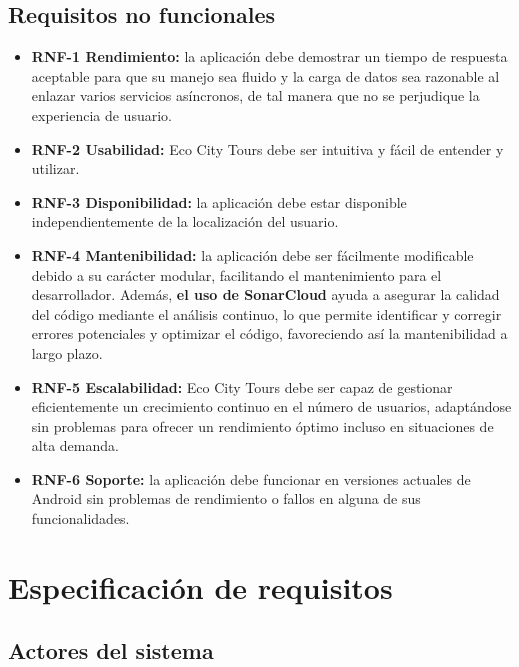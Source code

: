 \subsection{Requisitos no funcionales}
\begin{itemize}
	\item \textbf{RNF-1 Rendimiento:} la aplicación debe demostrar un tiempo de respuesta aceptable para que su manejo sea fluido y la carga de datos sea razonable al enlazar varios servicios asíncronos, de tal manera que no se perjudique la experiencia de usuario. 
	\item \textbf{RNF-2 Usabilidad:} Eco City Tours debe ser intuitiva y fácil de entender y utilizar.
	\item \textbf{RNF-3 Disponibilidad:} la aplicación debe estar disponible independientemente de la localización del usuario.
	\item \textbf{RNF-4 Mantenibilidad:} la aplicación debe ser fácilmente modificable debido a su carácter modular, facilitando el mantenimiento para el desarrollador. Además, \textbf{el uso de SonarCloud} ayuda a asegurar la calidad del código mediante el análisis continuo, lo que permite identificar y corregir errores potenciales y optimizar el código, favoreciendo así la mantenibilidad a largo plazo.
	
	\item \textbf{RNF-5 Escalabilidad:} Eco City Tours debe ser capaz de gestionar eficientemente un crecimiento continuo en el número de usuarios, adaptándose sin problemas para ofrecer un rendimiento óptimo incluso en situaciones de alta demanda.
	\item \textbf{RNF-6 Soporte:} la aplicación debe funcionar en versiones actuales de Android sin problemas de rendimiento o fallos en alguna de sus funcionalidades.
\end{itemize}
\clearpage

\section{Especificación de requisitos}

\subsection{Actores del sistema}

